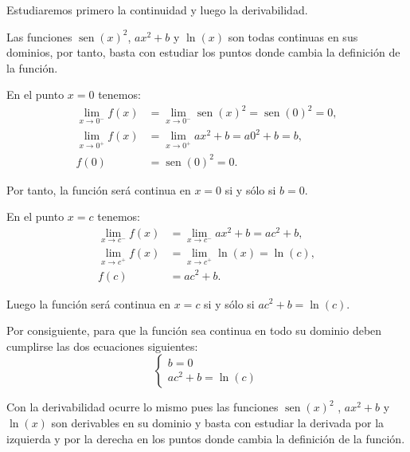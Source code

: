 \documentclass[
  spanish,
  a4paper,
]{scrreport}
\theoremstyle{definition}
\theoremstyle{remark}
\begin{document}
\begin{tcolorbox}[enhanced jigsaw, arc=.35mm, bottomrule=.15mm, bottomtitle=1mm, breakable, colback=white, colbacktitle=quarto-callout-tip-color!10!white, colframe=quarto-callout-tip-color-frame, coltitle=black, left=2mm, leftrule=.75mm, opacityback=0, opacitybacktitle=0.6, rightrule=.15mm, title=\textcolor{quarto-callout-tip-color}{\faLightbulb}\hspace{0.5em}{Solución}, titlerule=0mm, toprule=.15mm, toptitle=1mm]

Estudiaremos primero la continuidad y luego la derivabilidad.

Las funciones \(\operatorname{sen}(x)^2\), \(ax^2+b\) y \(\ln(x)\) son
todas continuas en sus dominios, por tanto, basta con estudiar los
puntos donde cambia la definición de la función.

En el punto \(x=0\) tenemos: \begin{align*}
\lim_{x\rightarrow 0^{-}}f(x) &= \lim_{x\rightarrow 0^{-}}\operatorname{sen}(x)^2=\operatorname{sen}(0)^2=0, \\
\lim_{x\rightarrow 0^{+}}f(x) &= \lim_{x\rightarrow 0^{+}}ax^2+b=a0^2+b=b, \\
f(0) &= \operatorname{sen}(0)^2=0.
\end{align*}

Por tanto, la función será continua en \(x=0\) si y sólo si \(b=0\).

En el punto \(x=c\) tenemos: \begin{align*}
\lim_{x\rightarrow c^{-}}f(x) &= \lim_{x\rightarrow c^{-}}ax^2+b=ac^2+b, \\
\lim_{x\rightarrow c^{+}}f(x) &= \lim_{x\rightarrow c^{+}}\ln(x)=\ln(c), \\
f(c) &= ac^2+b.
\end{align*}

Luego la función será continua en \(x=c\) si y sólo si
\(ac^2+b=\ln(c)\).

Por consiguiente, para que la función sea continua en todo su dominio
deben cumplirse las dos ecuaciones siguientes: \[
\begin{cases}
b=0 \\
ac^2+b = \ln(c)
\end{cases}
\]

Con la derivabilidad ocurre lo mismo pues las funciones
\(\operatorname{sen}(x)^2\) , \(ax^2+b\) y \(\ln(x)\) son derivables en
su dominio y basta con estudiar la derivada por la izquierda y por la
derecha en los puntos donde cambia la definición de la función.


\end{tcolorbox}
\end{document}

